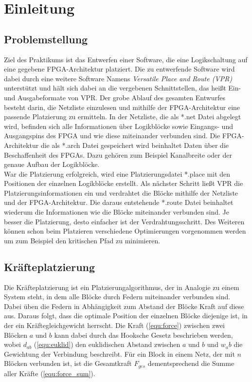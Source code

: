 \chapter{Einleitung}

    \section{Problemstellung}
        Ziel des Praktikums ist das Entwerfen einer Software, die eine Logikschaltung auf eine gegebene FPGA-Architektur platziert.
        Die zu entwerfende Software wird dabei durch eine weitere Software Namens \textit{Versatile Place and Route (VPR)} unterstützt und hält sich dabei an die vergebenen Schnittstellen,
        das heißt Ein- und Ausgabeformate von VPR.
        Der grobe Ablauf des gesamten Entwurfes besteht darin, die Netzliste einzulesen und
        mithilfe der FPGA-Architektur eine passende Platzierung zu ermitteln.
        In der Netzliste, die als *.net Datei abgelegt wird, befinden sich alle Informationen über
        Logikblöcke sowie Eingangs- und Ausgangspins des FPGA und wie diese miteinander verbunden sind.
        Die FPGA-Architektur die als *.arch Datei gespeichert wird beinhaltet Daten über die Beschaffenheit des FPGAs.
        Dazu gehören zum Beispiel Kanalbreite oder der genaue Aufbau der Logikblöcke.
        \\
        War die Platzierung erfolgreich, wird eine Platzierungsdatei *.place mit den Positionen der einzelnen Logikblöcke erstellt.
        Als nächster Schritt ließt VPR die Platzierungsinformationen ein und verdrahtet die Blöcke mithilfe der Netzliste und der FPGA-Architektur.
        Die daraus entstehende *.route Datei beinhaltet wiederum die Informationen wie die Blöcke miteinander verbunden sind.
        Je besser die Platzierung, desto einfacher ist der Verdrahtungsschritt.
        Des Weiteren können schon beim Platzieren verschiedene Optimierungen vorgenommen werden um zum Beispiel den kritischen Pfad zu minimieren.

    \section{Kräfteplatzierung}
        Die Kräfteplatzierung ist ein Platzierungalgorithmus, der in Analogie zu einem System steht, in dem alle Blöcke durch Federn miteinander verbunden sind.
        Dabei üben die Federn in Abhängigkeit zum Abstand der Blöcke Kraft auf diese aus.
        Daraus folgt, dass die optimale Position der einzelnen Blöcke diejenige ist, in der ein Kräftegleichgewicht herrscht.
        Die Kraft (\ref{equ:force}) zwischen zwei Blöcken $a$ und $b$ kann dabei durch das Hooksche Gesetz beschrieben werden, wobei $d_{ab}$ (\ref{equ:euklid}) den euklidischen Abstand zwischen $a$ und $b$
        und $w_ab$ die Gewichtung der Verbindung beschreibt. Für ein Block in einem Netz, der mit $n$ Blöcken verbunden ist,
        ist die Gesamtkraft $F_{ges}$ dementsprechend die Summe aller Kräfte (\ref{equ:force_sum}).

